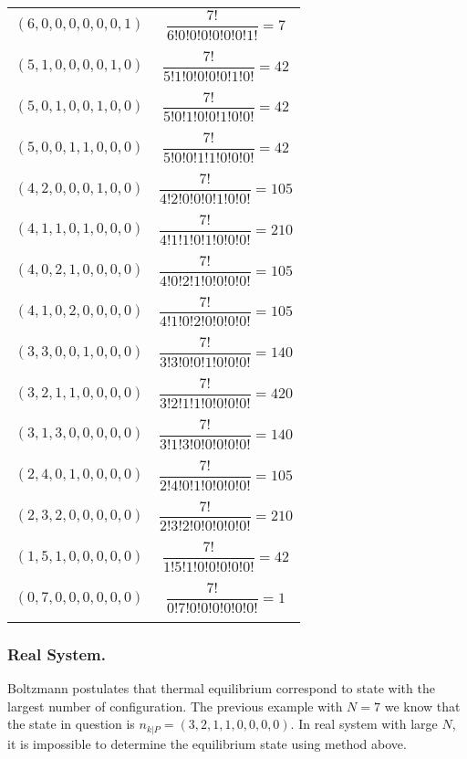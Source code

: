 \documentclass[../../../Main.tex]{subfiles}
\begin{document}
\begin{longtable}{c||c}
    $(6, 0, 0, 0, 0, 0, 0, 1)$&$\dfrac{7!}{6!0!0!0!0!0!0!1!} =7 $\\\\
    $(5, 1, 0, 0, 0, 0, 1, 0)$&$\dfrac{7!}{5!1!0!0!0!0!1!0!} =42 $\\\\
    $(5, 0, 1, 0, 0, 1, 0, 0)$&$\dfrac{7!}{5!0!1!0!0!1!0!0!} =42$\\\\
    $(5, 0, 0, 1, 1, 0, 0, 0)$&$\dfrac{7!}{5!0!0!1!1!0!0!0!} =42 $\\\\
    $(4, 2, 0, 0, 0, 1, 0, 0)$&$\dfrac{7!}{4!2!0!0!0!1!0!0!} =105$\\\\
    $(4, 1, 1, 0, 1, 0, 0, 0)$&$\dfrac{7!}{4!1!1!0!1!0!0!0!} =210 $\\\\
    $(4, 0, 2, 1, 0, 0, 0, 0)$&$\dfrac{7!}{4!0!2!1!0!0!0!0!} =105 $\\\\
    $(4, 1, 0, 2, 0, 0, 0, 0)$&$\dfrac{7!}{4!1!0!2!0!0!0!0!} =105 $\\\\
    $(3, 3, 0, 0, 1, 0, 0, 0)$&$\dfrac{7!}{3!3!0!0!1!0!0!0!} =140 $\\\\
    $(3, 2, 1, 1, 0, 0, 0, 0)$&$\dfrac{7!}{ 3!2!1!1!0!0!0!0!} =420 $\\\\
    $(3, 1, 3, 0, 0, 0, 0, 0)$&$\dfrac{7!}{3!1!3!0!0!0!0!0!} =140 $\\\\
    $(2, 4, 0, 1, 0, 0, 0, 0)$&$\dfrac{7!}{2!4!0!1!0!0!0!0!} =105 $\\\\
    $(2, 3, 2, 0, 0, 0, 0, 0)$&$\dfrac{7!}{2!3!2!0!0!0!0!0!} =210 $\\\\
    $(1, 5, 1, 0, 0, 0, 0, 0)$&$\dfrac{7!}{1!5!1!0!0!0!0!0!} =42 $\\\\
    $(0, 7, 0, 0, 0, 0, 0, 0)$&$\dfrac{7!}{0!7!0!0!0!0!0!0!} =1 $\\\\
\end{longtable}

\subsubsection*{ Real\textsuperscript{\texttrademark} System.} Boltzmann postulates that thermal equilibrium correspond to state with the largest number of configuration. The previous example with $N=7$ we know that the state in question is $n_{k|P}=(3, 2, 1, 1, 0, 0, 0, 0)$. In real system with large $N$, it is impossible to determine the equilibrium state using method above.
\end{document}
